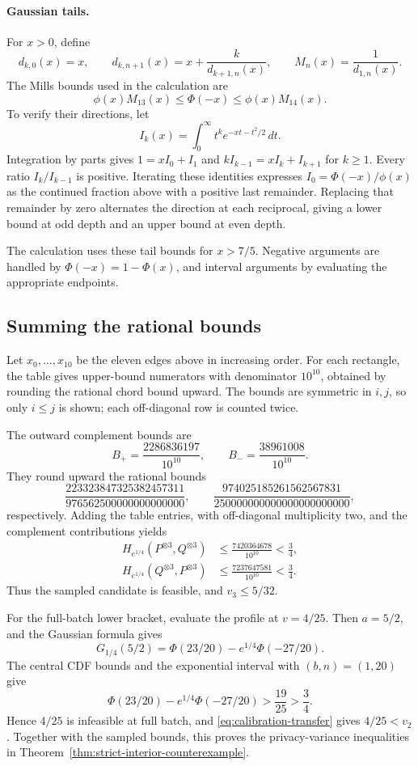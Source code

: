 \documentclass[11pt]{article}
\theoremstyle{remark}
\begin{document}
\paragraph{Gaussian tails.}
For $x>0$, define
\[
 d_{k,0}(x)=x,\qquad
 d_{k,n+1}(x)=x+\frac{k}{d_{k+1,n}(x)},\qquad
 M_n(x)=\frac1{d_{1,n}(x)}.
\]
The Mills bounds used in the calculation are
\[
 \phi(x)M_{13}(x)\leq\Phi(-x)\leq\phi(x)M_{14}(x).
\]
To verify their directions, let
\[
 I_k(x)=\int_0^\infty t^k e^{-xt-t^2/2}\,dt.
\]
Integration by parts gives $1=xI_0+I_1$ and
$kI_{k-1}=xI_k+I_{k+1}$ for $k\geq1$. Every ratio $I_k/I_{k-1}$ is positive.
Iterating these identities expresses $I_0=\Phi(-x)/\phi(x)$ as the continued
fraction above with a positive last remainder. Replacing that remainder by
zero alternates the direction at each reciprocal, giving a lower bound at
odd depth and an upper bound at even depth.

The calculation uses these tail bounds for $x>7/5$. Negative arguments are
handled by $\Phi(-x)=1-\Phi(x)$, and interval arguments by evaluating the
appropriate endpoints.

\subsection{Summing the rational bounds}
Let $x_0,\ldots,x_{10}$ be the eleven edges above in increasing order.
For each rectangle, the table gives upper-bound numerators with denominator
$10^{10}$, obtained by rounding the rational chord bound upward. The bounds
are symmetric in $i,j$, so only $i\leq j$ is shown; each off-diagonal row
is counted twice.

The outward complement bounds are
\[
 B_+=\frac{2286836197}{10^{10}},\qquad
 B_-=\frac{38961008}{10^{10}}.
\]
They round upward the rational bounds
\[
 \frac{223323847325382457311}{976562500000000000000},\qquad
 \frac{974025185261562567831}{250000000000000000000000},
\]
respectively. Adding the table entries, with off-diagonal multiplicity two,
and the complement contributions yields
\begin{align}
 H_{e^{1/4}}(P^{\otimes3}, Q^{\otimes3})
 &\leq\frac{7420364678}{10^{10}}<\frac34,
 \label{eq:rational-forward-total}\\
 H_{e^{1/4}}(Q^{\otimes3}, P^{\otimes3})
 &\leq\frac{7237647581}{10^{10}}<\frac34.
 \label{eq:rational-reverse-total}
\end{align}
Thus the sampled candidate is feasible, and $v_3\leq5/32$.

For the full-batch lower bracket, evaluate the profile at $v=4/25$. Then
$a=5/2$, and the Gaussian formula gives
\[
 G_{1/4}(5/2)=\Phi(23/20)-e^{1/4}\Phi(-27/20).
\]
The central CDF bounds and the exponential interval with $(b,n)=(1,20)$ give
\[
 \Phi(23/20)-e^{1/4}\Phi(-27/20)>\frac{19}{25}>\frac34.
\]
Hence $4/25$ is infeasible at full batch, and
\eqref{eq:calibration-transfer} gives $4/25<v_2$. Together with the sampled
bounds, this proves the privacy-variance inequalities in
Theorem~\ref{thm:strict-interior-counterexample}.
\end{document}
